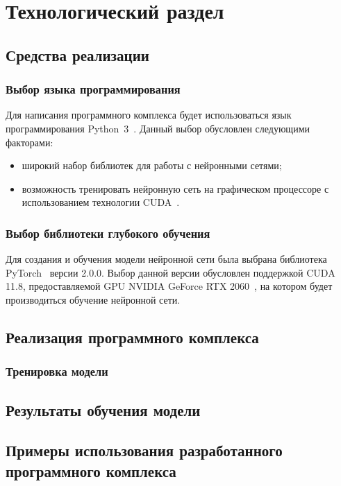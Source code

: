 \chapter{Технологический раздел}

\section{Средства реализации}

\subsection{Выбор языка программирования}

Для написания программного комплекса будет использоваться язык программирования Python~3~\cite{python3}. Данный выбор обусловлен следующими факторами:
\begin{itemize}[label=---]
    \item широкий набор библиотек для работы с нейронными сетями;
    \item возможность тренировать нейронную сеть на графическом процессоре с
использованием технологии CUDA~\cite{cuda}.
\end{itemize}

\subsection{Выбор библиотеки глубокого обучения}

Для создания и обучения модели нейронной сети была выбрана библиотека PyTorch~\cite{pytorch} версии 2.0.0. Выбор данной версии обусловлен поддержкой CUDA 11.8, предоставляемой GPU NVIDIA GeForce RTX 2060~\cite{rtx2060}, на котором будет производиться обучение нейронной сети.

\section{Реализация программного комплекса}

\subsection{Тренировка модели}

\section{Результаты обучения модели}

\section{Примеры использования разработанного программного комплекса}
